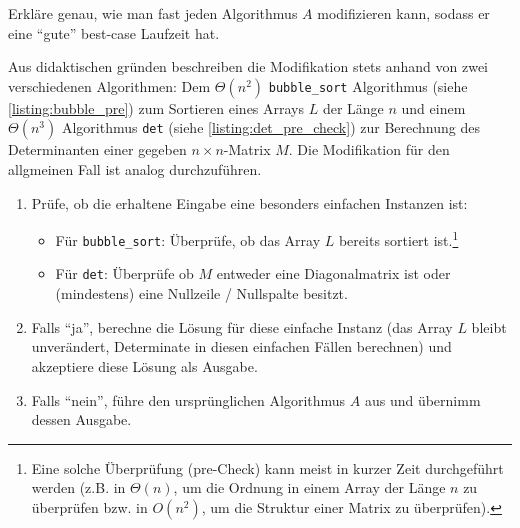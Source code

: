 \begin{questions}


	\question[2] Erkläre genau, wie man fast jeden Algorithmus $A$  modifizieren kann, sodass er eine \enquote{gute} best-case Laufzeit hat.
	\begin{solution}
Aus didaktischen gründen beschreiben die Modifikation stets anhand von zwei verschiedenen Algorithmen: Dem $\Theta(n^2)$ \lstinline|bubble_sort| Algorithmus (siehe \cref{listing:bubble_pre}) zum Sortieren eines Arrays $L$ der Länge $n$ und einem $\Theta(n^3)$ Algorithmus \lstinline|det| (siehe \cref{listing:det_pre_check}) zur Berechnung des Determinanten einer gegeben $n\times n$-Matrix $M$. Die Modifikation für den allgmeinen Fall ist analog durchzuführen.

\begin{enumerate}
\item Prüfe, ob die erhaltene Eingabe eine besonders einfachen Instanzen ist:
\begin{itemize}
	\item Für \lstinline|bubble_sort|: Überprüfe, ob das Array $L$ bereits sortiert ist.\footnote{Eine solche Überprüfung (pre-Check) kann meist in kurzer Zeit durchgeführt werden (z.B. in $\Theta(n)$, um die Ordnung in einem Array der Länge $n$ zu überprüfen bzw. in $O(n^2)$, um die Struktur einer Matrix zu überprüfen).}
	\item Für \lstinline|det|: Überprüfe ob $M$ entweder eine Diagonalmatrix ist oder (mindestens) eine Nullzeile / Nullspalte besitzt.
\end{itemize}
\item Falls \enquote{ja}, berechne die Lösung für diese einfache Instanz (das Array $L$ bleibt unverändert, Determinate in diesen einfachen Fällen berechnen) und akzeptiere diese Lösung als Ausgabe.
\item Falls \enquote{nein}, führe den ursprünglichen Algorithmus $A$ aus und übernimm dessen Ausgabe.
\end{enumerate}


\end{solution}
\end{questions}
